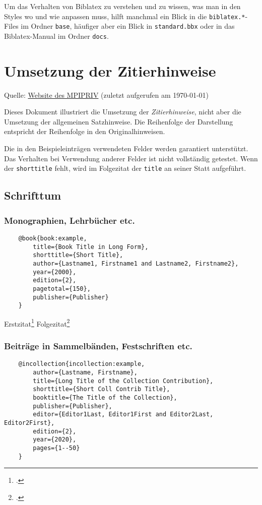 \documentclass[a4paper]{article}
\begin{document}
Um das Verhalten von Biblatex zu verstehen und zu wissen, was man in den Styles wo und wie anpassen muss, hilft manchmal ein Blick in die \texttt{biblatex.*}-Files im Ordner \texttt{base}, 
häufiger aber ein Blick in \texttt{standard.bbx} oder in das Biblatex-Manual im Ordner \texttt{docs}.


\section{Umsetzung der Zitierhinweise}

Quelle: \hyperref{https://www.mpipriv.de/862378/03\_Stylesheet-fuer-Autor\_innen.pdf}{}{}{Website des MPIPRIV} (zuletzt aufgerufen am \today)

Dieses Dokument illustriert die Umsetzung der \emph{Zitierhinweise}, nicht aber die Umsetzung der allgemeinen Satzhinweise. 
Die Reihenfolge der Darstellung entspricht der Reihenfolge in den Originalhinweisen. 

Die in den Beispieleinträgen verwendeten Felder werden garantiert unterstützt. 
Das Verhalten bei Verwendung anderer Felder ist nicht vollständig getestet.
Wenn der \texttt{shorttitle} fehlt, wird im Folgezitat der \texttt{title} an seiner Statt aufgeführt.

\subsection{Schrifttum}

\subsubsection{Monographien, Lehrbücher etc.}
	
\begin{Verbatim}
	@book{book:example,
		title={Book Title in Long Form},
		shorttitle={Short Title},
		author={Lastname1, Firstname1 and Lastname2, Firstname2},
		year={2000},
		edition={2},
		pagetotal={150},
		publisher={Publisher}
	}
\end{Verbatim}
	
Erstzitat\footcite[10]{book:example}
Folgezitat\footcite[20]{book:example}
	
\subsubsection{Beiträge in Sammelbänden, Festschriften etc.}
	
\begin{Verbatim}
	@incollection{incollection:example, 
		author={Lastname, Firstname}, 
		title={Long Title of the Collection Contribution}, 
		shorttitle={Short Coll Contrib Title},
		booktitle={The Title of the Collection}, 
		publisher={Publisher}, 
		editor={Editor1Last, Editor1First and Editor2Last, Editor2First}, 
		edition={2},
		year={2020}, 
		pages={1--50}
	}
\end{Verbatim}
	
\end{document}
